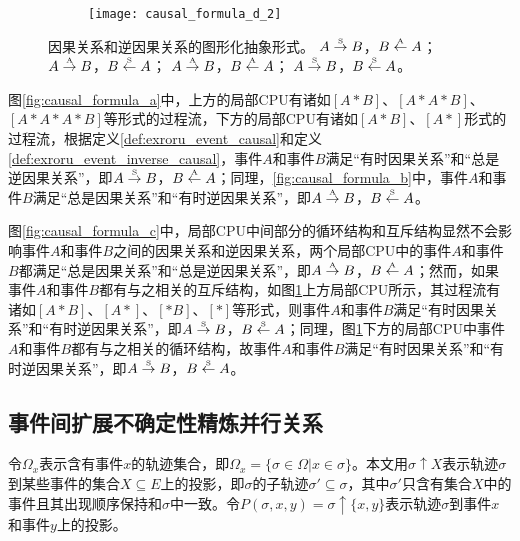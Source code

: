 \begin{figure}[htbp]
\begin{subfigure}{0.85\textwidth}
\begin{minipage}[b]{1\textwidth}
  	  \vspace{1em}
  	  \centering
  	  \texttt{[image: causal\_formula\_d\_2]}
  	\end{minipage}
  	\caption{}
  	\label{fig:causal_formula_d}
  \end{subfigure}
  \vspace{6pt}
  \caption{因果关系和逆因果关系的图形化抽象形式。 $A\overset{\text{\tiny{S}}}{\rightarrow}B$，$B\overset{\text{\tiny{A}}}{\leftarrow}A$； $A\overset{\text{\tiny{A}}}{\rightarrow}B$，$B\overset{\text{\tiny{S}}}{\leftarrow}A$； $A\overset{\text{\tiny{A}}}{\rightarrow}B$，$B\overset{\text{\tiny{A}}}{\leftarrow}A$； $A\overset{\text{\tiny{S}}}{\rightarrow}B$，$B\overset{\text{\tiny{S}}}{\leftarrow}A$。}
  \label{fig:event_causal_formulas}
\end{figure}

图\ref{fig:causal_formula_a}中，上方的局部CPU有诸如$[A*B]$、$[A*A*B]$、$[A*A*A*B]$等形式的过程流，下方的局部CPU有诸如$[A*B]$、$[A*]$形式的过程流，根据定义\ref{def:exroru_event_causal}和定义\ref{def:exroru_event_inverse_causal}，事件$A$和事件$B$满足“有时因果关系”和“总是逆因果关系”，即$A\overset{\text{\tiny{S}}}{\rightarrow}B$，$B\overset{\text{\tiny{A}}}{\leftarrow}A$；同理，\ref{fig:causal_formula_b}中，事件$A$和事件$B$满足“总是因果关系”和“有时逆因果关系”，即$A\overset{\text{\tiny{A}}}{\rightarrow}B$，$B\overset{\text{\tiny{S}}}{\leftarrow}A$。

图\ref{fig:causal_formula_c}中，局部CPU中间部分的循环结构和互斥结构显然不会影响事件$A$和事件$B$之间的因果关系和逆因果关系，两个局部CPU中的事件$A$和事件$B$都满足“总是因果关系”和“总是逆因果关系”，即$A\overset{\text{\tiny{A}}}{\rightarrow}B$，$B\overset{\text{\tiny{A}}}{\leftarrow}A$；然而，如果事件$A$和事件$B$都有与之相关的互斥结构，如图\ref{fig:causal_formula_d}上方局部CPU所示，其过程流有诸如$[A*B]$、$[A*]$、$[*B]$、$[*]$等形式，则事件$A$和事件$B$满足“有时因果关系”和“有时逆因果关系”，即$A\overset{\text{\tiny{S}}}{\rightarrow}B$，$B\overset{\text{\tiny{S}}}{\leftarrow}A$；同理，图\ref{fig:causal_formula_d}下方的局部CPU中事件$A$和事件$B$都有与之相关的循环结构，故事件$A$和事件$B$满足“有时因果关系”和“有时逆因果关系”，即$A\overset{\text{\tiny{S}}}{\rightarrow}B$，$B\overset{\text{\tiny{S}}}{\leftarrow}A$。

\subsection{事件间扩展不确定性精炼并行关系}\label{subsec:exroru_event_concurrent}
令$\Omega_{x}$表示含有事件$x$的轨迹集合，即$\Omega_{x}=\{\sigma\in\Omega|x\in\sigma\}$。本文用$\sigma\uparrow X$表示轨迹$\sigma$到某些事件的集合$X\subseteq E$上的投影，即$\sigma$的子轨迹$\sigma'\subseteq\sigma$，其中$\sigma'$只含有集合$X$中的事件且其出现顺序保持和$\sigma$中一致。令$P(\sigma,x,y)=\sigma\uparrow\{x,y\}$表示轨迹$\sigma$到事件$x$和事件$y$上的投影。

